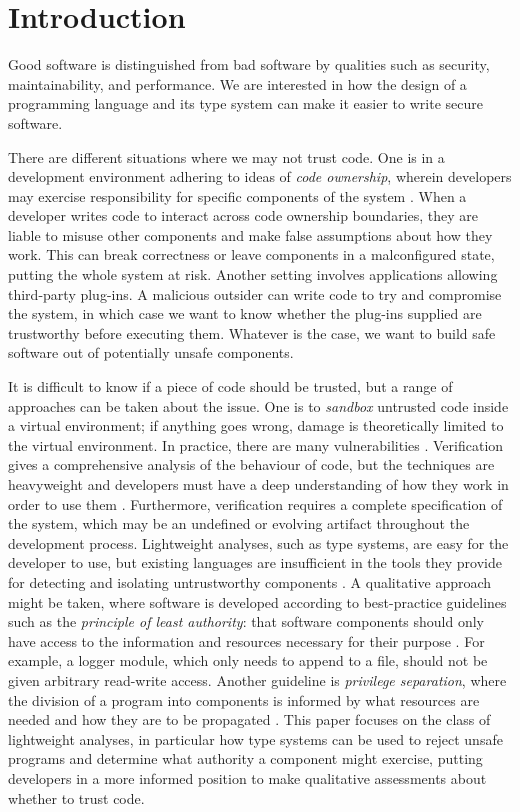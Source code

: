 \section{Introduction}

Good software is distinguished from bad software by qualities such as security, maintainability, and performance. We are interested in how the design of a programming language and its type system can make it easier to write secure software.

There are different situations where we may not trust code. One is in a development environment adhering to ideas of \textit{code ownership}, wherein developers may exercise responsibility for specific components of the system \cite{bird11}. When a developer writes code to interact across code ownership boundaries, they are liable to misuse other components and make false assumptions about how they work. This can break correctness or leave components in a malconfigured state, putting the whole system at risk. Another setting involves applications allowing third-party plug-ins. A malicious outsider can write code to try and compromise the system, in which case we want to know whether the plug-ins supplied are trustworthy before executing them. Whatever is the case, we want to build safe software out of potentially unsafe components.

It is difficult to know if a piece of code should be trusted, but a range of approaches can be taken about the issue. One is to \textit{sandbox} untrusted code inside a virtual environment; if anything goes wrong, damage is theoretically limited to the virtual environment. In practice, there are many  vulnerabilities \cite{coker15, maass16, watson07, schreuders13}. Verification gives a comprehensive analysis of the behaviour of code, but the techniques are heavyweight and developers must have a deep understanding of how they work in order to use them \cite{kneuper97}. Furthermore, verification requires a complete specification of the system, which may be an undefined or evolving artifact throughout the development process. Lightweight analyses, such as type systems, are easy for the developer to use, but existing languages are insufficient in the tools they provide for detecting and isolating untrustworthy components \cite{chen07, ter-louw08}. A qualitative approach might be taken, where software is developed according to best-practice guidelines such as the \textit{principle of least authority}: that software components should only have access to the information and resources necessary for their purpose \cite{saltzer74}. For example, a logger module, which only needs to append to a file, should not be given arbitrary read-write access. Another guideline is \textit{privilege separation}, where the division of a program into components is informed by what resources are needed and how they are to be propagated \cite{saltzer75}. This paper focuses on the class of lightweight analyses, in particular how type systems can be used to reject unsafe programs and determine what authority a component might exercise, putting developers in a more informed position to make qualitative assessments about whether to trust code.

